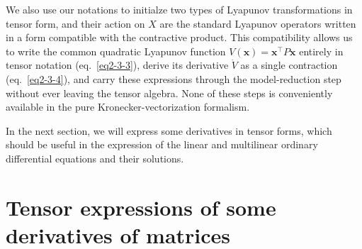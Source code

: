 \documentclass[11pt, oneside]{article}  %
\newcommand{\bx}{\textbf{x}}
\begin{document}
We also use our notations to initialze two types of Lyapunov transformations in tensor form, and their action on $X$ are the standard Lyapunov 
operators written in a form compatible with the contractive product.  This compatibility allows us to write the common quadratic Lyapunov 
function $V(\bx)=\bx^{\top}P\bx$ entirely in tensor notation (eq.~\eqref{eq2-3-3}), derive its derivative $\dot{V}$ as a single contraction 
(eq.~\eqref{eq2-3-4}), and carry these expressions through the model-reduction step without ever leaving the tensor algebra.  None of these steps 
is conveniently available in the pure Kronecker-vectorization formalism.

In the next section, we will express some derivatives in tensor forms, which should be useful in the expression of the linear and multilinear ordinary 
differential equations and their solutions.  

\vskip 5pt
\section{Tensor expressions of some derivatives of matrices}
\label{sec3} 
\setcounter{equation}{0} 
\end{document}
